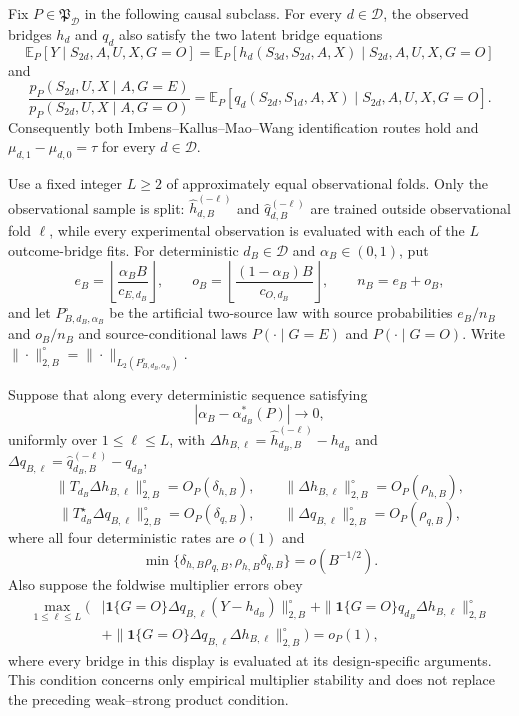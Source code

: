 Fix \(P\in\mathfrak P_{\mathcal D}\) in the following causal subclass.  For every \(d\in\mathcal D\), the observed bridges \(h_d\) and \(q_d\) also satisfy the two latent bridge equations
\[
 \mathbb E_P[Y\mid S_{2d},A,U,X,G=O]
 =\mathbb E_P[h_d(S_{3d},S_{2d},A,X)\mid S_{2d},A,U,X,G=O]
\]
and
\[
 \frac{p_P(S_{2d},U,X\mid A,G=E)}{p_P(S_{2d},U,X\mid A,G=O)}
 =\mathbb E_P[q_d(S_{2d},S_{1d},A,X)\mid S_{2d},A,U,X,G=O].
\]
Consequently both Imbens--Kallus--Mao--Wang identification routes hold and \(\mu_{d,1}-\mu_{d,0}=\tau\) for every \(d\in\mathcal D\).

Use a fixed integer \(L\ge2\) of approximately equal observational folds.  Only the observational sample is split: \(\widehat h_{d,B}^{(-\ell)}\) and \(\widehat q_{d,B}^{(-\ell)}\) are trained outside observational fold \(\ell\), while every experimental observation is evaluated with each of the \(L\) outcome-bridge fits.  For deterministic \(d_B\in\mathcal D\) and \(\alpha_B\in(0,1)\), put
\[
 e_B=\left\lfloor\frac{\alpha_BB}{c_{E,d_B}}\right\rfloor,
 \qquad
 o_B=\left\lfloor\frac{(1-\alpha_B)B}{c_{O,d_B}}\right\rfloor,
 \qquad n_B=e_B+o_B,
\]
and let \(P_{B,d_B,\alpha_B}^{\circ}\) be the artificial two-source law with source probabilities \(e_B/n_B\) and \(o_B/n_B\) and source-conditional laws \(P(\cdot\mid G=E)\) and \(P(\cdot\mid G=O)\).  Write \(\|\cdot\|_{2,B}^{\circ}=\|\cdot\|_{L_2(P_{B,d_B,\alpha_B}^{\circ})}\).

Suppose that along every deterministic sequence satisfying
\[
 |\alpha_B-\alpha_{d_B}^*(P)|\longrightarrow0,
\]
uniformly over \(1\le\ell\le L\), with
\(\Delta h_{B,\ell}=\widehat h_{d_B,B}^{(-\ell)}-h_{d_B}\) and
\(\Delta q_{B,\ell}=\widehat q_{d_B,B}^{(-\ell)}-q_{d_B}\),
\[
 \|T_{d_B}\Delta h_{B,\ell}\|_{2,B}^{\circ}=O_P(\delta_{h,B}),
 \qquad
 \|\Delta h_{B,\ell}\|_{2,B}^{\circ}=O_P(\rho_{h,B}),
\]
\[
 \|T_{d_B}^{\star}\Delta q_{B,\ell}\|_{2,B}^{\circ}=O_P(\delta_{q,B}),
 \qquad
 \|\Delta q_{B,\ell}\|_{2,B}^{\circ}=O_P(\rho_{q,B}),
\]
where all four deterministic rates are \(o(1)\) and
\[
 \min\{\delta_{h,B}\rho_{q,B},\rho_{h,B}\delta_{q,B}\}
 =o(B^{-1/2}).
\]
Also suppose the foldwise multiplier errors obey
\[
\begin{aligned}
 \max_{1\le\ell\le L}\bigl(&|\mathbf 1\{G=O\}\Delta q_{B,\ell}
       (Y-h_{d_B})\|_{2,B}^{\circ}
 +\|\mathbf 1\{G=O\}q_{d_B}\Delta h_{B,\ell}\|_{2,B}^{\circ}\\
 &+\|\mathbf 1\{G=O\}\Delta q_{B,\ell}\Delta h_{B,\ell}\|_{2,B}^{\circ}
 \bigr)=o_P(1),
\end{aligned}
\]
where every bridge in this display is evaluated at its design-specific arguments.  This condition concerns only empirical multiplier stability and does not replace the preceding weak--strong product condition.

